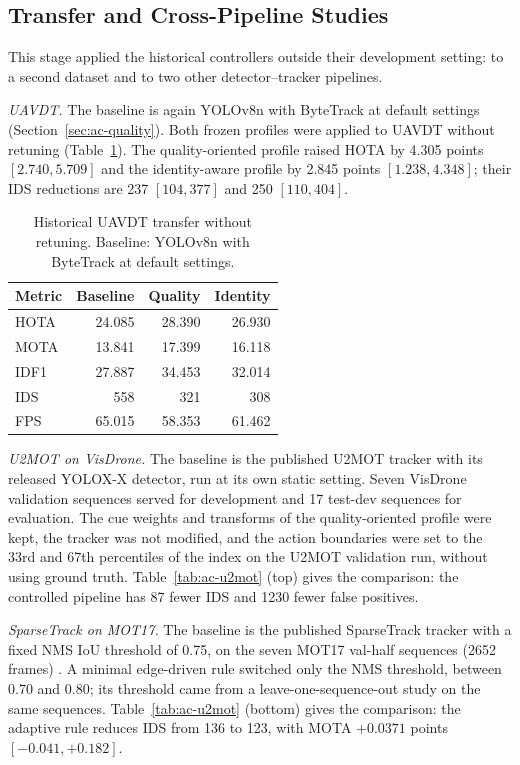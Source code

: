 \subsection{Transfer and Cross-Pipeline Studies}\label{sec:ac-transfer}
This stage applied the historical controllers outside their development setting: to a second dataset and to two other detector--tracker pipelines.

\emph{UAVDT.} The baseline is again YOLOv8n with ByteTrack at default settings (Section~\ref{sec:ac-quality}). Both frozen profiles were applied to UAVDT \cite{du2018uavdt} without retuning (Table~\ref{tab:ac-histuavdt}). The quality-oriented profile raised HOTA by 4.305 points $[2.740, 5.709]$ and the identity-aware profile by 2.845 points $[1.238, 4.348]$; their IDS reductions are 237 $[104, 377]$ and 250 $[110, 404]$.

\begin{table}[tbp]
\centering
\caption{Historical UAVDT transfer without retuning. Baseline: YOLOv8n with ByteTrack at default settings.}
\label{tab:ac-histuavdt}
\begin{tabular}{lrrr}
\toprule
Metric & Baseline & Quality & Identity\\
\midrule
HOTA & 24.085 & 28.390 & 26.930\\
MOTA & 13.841 & 17.399 & 16.118\\
IDF1 & 27.887 & 34.453 & 32.014\\
IDS & 558 & 321 & 308\\
FPS & 65.015 & 58.353 & 61.462\\
\bottomrule
\end{tabular}
\end{table}

\emph{U2MOT on VisDrone.} The baseline is the published U2MOT tracker \cite{liu2023u2mot} with its released YOLOX-X detector, run at its own static setting. Seven VisDrone validation sequences served for development and 17 test-dev sequences for evaluation. The cue weights and transforms of the quality-oriented profile were kept, the tracker was not modified, and the action boundaries were set to the 33rd and 67th percentiles of the index on the U2MOT validation run, without using ground truth. Table~\ref{tab:ac-u2mot} (top) gives the comparison: the controlled pipeline has 87 fewer IDS and 1230 fewer false positives.

\emph{SparseTrack on MOT17.} The baseline is the published SparseTrack tracker \cite{liu2025sparsetrack} with a fixed NMS IoU threshold of 0.75, on the seven MOT17 val-half sequences (2652 frames) \cite{dendorfer2021motchallenge}. A minimal edge-driven rule switched only the NMS threshold, between 0.70 and 0.80; its threshold came from a leave-one-sequence-out study on the same sequences. Table~\ref{tab:ac-u2mot} (bottom) gives the comparison: the adaptive rule reduces IDS from 136 to 123, with MOTA $+0.0371$ points $[-0.041, +0.182]$.

